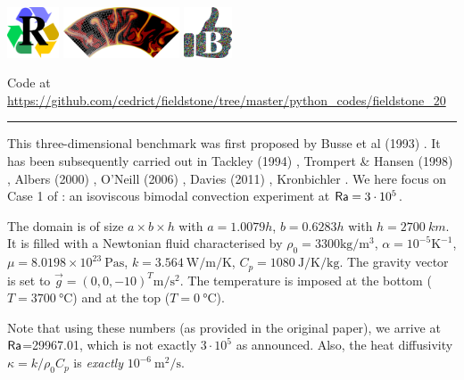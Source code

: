 
\includegraphics[height=1.5cm]{images/pictograms/replication}
\includegraphics[height=1.5cm]{images/pictograms/aspect_logo}
\includegraphics[height=1.5cm]{images/pictograms/benchmark}



\begin{center}
Code at \url{https://github.com/cedrict/fieldstone/tree/master/python_codes/fieldstone_20}
\end{center}

\par\noindent\rule{\textwidth}{0.4pt}

This three-dimensional benchmark was first proposed by Busse et al (1993) \cite{bucc94}. 
It has been subsequently carried out in Tackley (1994) \cite{tack94},
Trompert \& Hansen (1998) \cite{trha98}, Albers (2000) \cite{albe00},
O'Neill \etal (2006) \cite{onmm06}, Davies \etal (2011) \cite{dawk11}, Kronbichler \etal \cite{krhb12}.
We here focus on Case 1 of \cite{bucc94}:  an isoviscous bimodal convection experiment at ${\mathsf{Ra}}=3\cdot 10^5$.

The domain is of size $a\times b\times h$ with $a=1.0079h$, $b=0.6283h$ 
with $h=\SI{2700}{km}$. It is filled with a Newtonian fluid 
characterised by $\rho_0=3300\si{\kg\per\cubic\meter}$, $\alpha=10^{-5}\si{\kelvin}^{-1}$, 
$\mu=8.0198\times10^{23}~\si{\pascal\second}$, 
$k=3.564~\si{\watt\per\meter\per\kelvin}$, 
$C_p=1080~\si{\joule\per\kelvin\per\kg}$.
The gravity vector is set to $\vec{g}=(0,0,-10)^T\si{\meter\per\square\second}$.
The temperature is imposed at the bottom  ($T=3700~\si{\celsius}$) and at the top ($T=0~\si{\celsius}$).

Note that using these numbers (as provided in the original paper), we arrive at ${\mathsf{Ra}}$=29967.01, which 
is not exactly $3\cdot10^5$ as announced. Also, the heat diffusivity $\kappa=k/\rho_0 C_p$ is 
{\it exactly} $10^{-6}~\si{\square\meter\per\second}$.

